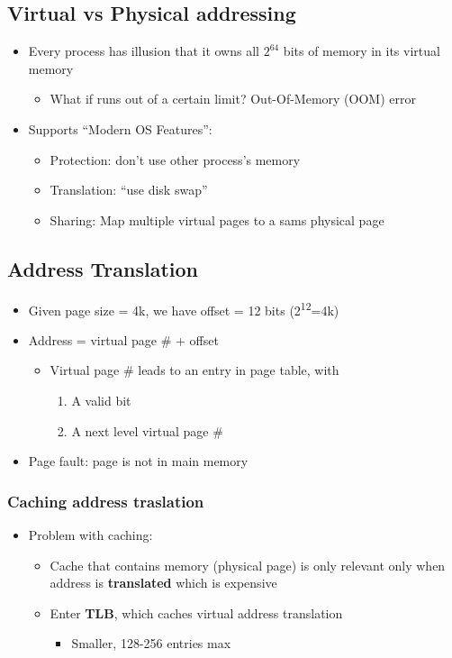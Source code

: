 \documentclass[11pt]{article}
\begin{document}
\subsection{Virtual vs Physical addressing}
\label{sec:org7d7912f}
\begin{itemize}
\item Every process has illusion that it owns all \(2^{64}\) bits of memory in its
virtual memory
\begin{itemize}
\item What if runs out of a certain limit? Out-Of-Memory (OOM) error
\end{itemize}
\item Supports ``Modern OS Features'':
\begin{itemize}
\item Protection: don't use other process's memory
\item Translation: ``use disk swap''
\item Sharing: Map multiple virtual pages to a sams physical page
\end{itemize}
\end{itemize}
\subsection{Address Translation}
\label{sec:orgead3566}
\begin{itemize}
\item Given page size = 4k, we have offset = 12 bits (2\textsuperscript{12}=4k)
\item Address = virtual page \# + offset
\begin{itemize}
\item Virtual page \# leads to an entry in page table, with
\begin{enumerate}
\item A valid bit
\item A next level virtual page \#
\end{enumerate}
\end{itemize}
\item Page fault: page is not in main memory
\end{itemize}
\subsubsection{Caching address traslation}
\label{sec:org565e307}
\begin{itemize}
\item Problem with caching:
\begin{itemize}
\item Cache that contains memory (physical page) is only relevant only when
address is \textbf{translated} which is expensive
\item Enter \textbf{TLB}, which caches virtual address translation
\begin{itemize}
\item Smaller, 128-256 entries max
\end{itemize}
\end{itemize}
\end{itemize}
\end{document}
